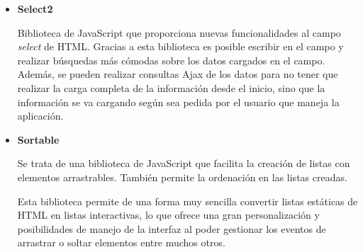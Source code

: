 \begin{itemize}
\item\textbf{Select2}

Biblioteca de JavaScript que proporciona nuevas funcionalidades al campo \textit{select} de HTML. 
Gracias a esta biblioteca es posible escribir en el campo y realizar búsquedas más cómodas sobre los datos cargados en el campo.
Además, se pueden realizar consultas Ajax de los datos para no tener que realizar la carga completa de la información desde el inicio, sino que la información se va cargando según sea pedida por el usuario que maneja la aplicación.

\item\textbf{Sortable}

Se trata de una biblioteca de JavaScript que facilita la creación de listas con elementos arrastrables. También permite la ordenación en las listas creadas.

Esta biblioteca permite de una forma muy sencilla convertir listas estáticas de HTML en listas interactivas, lo que ofrece una gran personalización y posibilidades de manejo de la interfaz al poder gestionar los eventos de arrastrar o soltar elementos entre muchos otros. 
\end{itemize}

